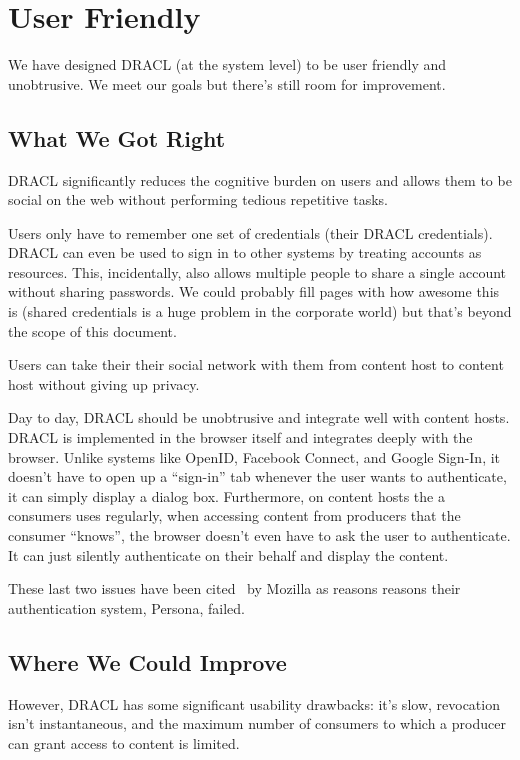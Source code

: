 \documentclass[pdftex,12pt,a4papaer,twoside,notitlepage]{report}
\begin{document}
\section{User Friendly}
\label{sec:user_friendly}

We have designed DRACL (at the system level) to be user friendly and
unobtrusive. We meet our goals but there's still room for improvement.

\subsection{What We Got Right}

DRACL significantly reduces the cognitive burden on users and allows them to be
social on the web without performing tedious repetitive tasks.

Users only have to remember one set of credentials (their DRACL credentials).
DRACL can even be used to sign in to other systems by treating accounts as
resources. This, incidentally, also allows multiple people to share a single
account without sharing passwords. We could probably fill pages with how awesome
this is (shared credentials is a huge problem in the corporate world) but that's
beyond the scope of this document.

Users can take their their social network with them from content host to content
host without giving up privacy.

Day to day, DRACL should be unobtrusive and integrate well with content hosts.
DRACL is implemented in the browser itself and integrates deeply with the
browser. Unlike systems like OpenID, Facebook Connect, and Google Sign-In, it
doesn't have to open up a ``sign-in'' tab whenever the user wants to
authenticate, it can simply display a dialog box. Furthermore, on content hosts
the a consumers uses regularly, when accessing content from producers that the
consumer ``knows'', the browser doesn't even have to ask the user to
authenticate. It can just silently authenticate on their behalf and display the
content.

These last two issues have been cited~\cite{persona-fail} by Mozilla as reasons
reasons their authentication system, Persona, failed.

\subsection{Where We Could Improve}
\label{sub:usability_improve}

However, DRACL has some significant usability drawbacks: it's slow, revocation
isn't instantaneous, and the maximum number of consumers to which a producer can
grant access to content is limited.
\end{document}
